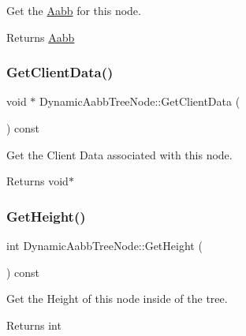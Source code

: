 Get the \hyperlink{classAabb}{Aabb} for this node. 

\begin{DoxyReturn}{Returns}
\hyperlink{classAabb}{Aabb} 
\end{DoxyReturn}
\mbox{\label{classDynamicAabbTreeNode_a9c1101785913748b9f5e64b0842425a5}} 
\subsubsection{\texorpdfstring{Get\+Client\+Data()}{GetClientData()}}
{\footnotesize\ttfamily void $\ast$ Dynamic\+Aabb\+Tree\+Node\+::\+Get\+Client\+Data (\begin{DoxyParamCaption}{ }\end{DoxyParamCaption}) const}



Get the Client Data associated with this node. 

\begin{DoxyReturn}{Returns}
void$\ast$ 
\end{DoxyReturn}
\mbox{\label{classDynamicAabbTreeNode_ac36d17b0d2fe72b0cbfe513e54995ac2}} 
\subsubsection{\texorpdfstring{Get\+Height()}{GetHeight()}}
{\footnotesize\ttfamily int Dynamic\+Aabb\+Tree\+Node\+::\+Get\+Height (\begin{DoxyParamCaption}{ }\end{DoxyParamCaption}) const}



Get the Height of this node inside of the tree. 

\begin{DoxyReturn}{Returns}
int 
\end{DoxyReturn}
\mbox{\label{classDynamicAabbTreeNode_a80c6ed32f3c5440f524ec38cdbf31a03}} 
